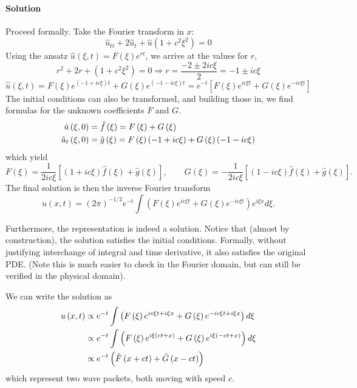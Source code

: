\documentclass[letterpaper,twoside,11pt]{article}
\theoremstyle{mystyle}
\begin{document}
\paragraph*{Solution} Proceed formally. Take the Fourier transform in $x$: 
\[{{\hat u}_{tt}} + 2{{\hat u}_t} + \hat u\left( {1 + {c^2}{\xi ^2}} \right) = 0\]
Using the ansatz $\hat u (\xi, t) = F(\xi)e^{rt}$, we arrive at the values for $r$, 
\[{r^2} + 2r + \left( {1 + {c^2}{\xi ^2}} \right) = 0 \Rightarrow r = \frac{{ - 2 \pm 2ic\xi }}{2} =  - 1 \pm ic\xi \]
\[\hat u\left( {\xi ,t} \right) = F\left( \xi  \right){e^{\left( { - 1 + ic\xi } \right)t}} + G\left( \xi  \right){e^{\left( { - 1 - ic\xi } \right)t}} = {e^{ - t}}\left[ {F\left( \xi  \right){e^{ic\xi t}} + G\left( \xi  \right){e^{ - ic\xi t}}} \right]\]
The initial conditions can also be transformed, and building those in, we find formulas for the unknown coefficients $F$ and $G$. 
\begin{align*}
  \hat u\left( {\xi ,0} \right) &= \hat f\left( \xi  \right) = F\left( \xi  \right) + G\left( \xi  \right) \hfill \\
  {{\hat u}_t}\left( {\xi ,0} \right) &= \hat g\left( \xi  \right) = F\left( \xi  \right)\left( { - 1 + ic\xi } \right) + G\left( \xi  \right)\left( { - 1 - ic\xi } \right) 
\end{align*}
which yield 
\[F\left( \xi  \right) = \frac{1}{{2ic\xi }}\left[ {\left( {1 + ic\xi } \right)\hat f\left( \xi  \right) + \hat g\left( \xi  \right)} \right],\qquad G\left( \xi  \right) =  - \frac{1}{{2ic\xi }}\left[ {\left( {1 - ic\xi } \right)\hat f\left( \xi  \right) + \hat g (\xi)} \right].\]
The final solution is then the inverse Fourier transform 
\[u\left( {x,t} \right) = {\left( {2\pi } \right)^{ - 1/2}}{e^{ - t}}\int {\left( {F\left( \xi  \right){e^{ic\xi t}} + G\left( \xi  \right){e^{ - ic\xi t}}} \right){e^{i\xi x}}d\xi } .\]

Furthermore, the representation is indeed a solution. Notice that (almost by construction), the solution satisfies the initial conditions. Formally, without justifying interchange of integral and time derivative, it also satisfies the original PDE. (Note this is much easier to check in the Fourier domain, but can still be verified in the physical domain). 

We can write the solution as 
\begin{align*}
  u\left( {x,t} \right) &\propto {e^{ - t}}\int {\left( {F\left( \xi  \right){e^{ic\xi t + i\xi x}} + G\left( \xi  \right){e^{ - ic\xi t + i\xi x}}} \right)d\xi }  \hfill \\
   &\propto {e^{ - t}}\int {\left( {F\left( \xi  \right){e^{i\xi \left( {ct + x} \right)}} + G\left( \xi  \right){e^{i\xi \left( { - ct + x} \right)}}} \right)d\xi }  \hfill \\
   &\propto {e^{ - t}}\left( {\check{F} \left( {x + ct} \right) +  \check G \left( {x - ct} \right)} \right) 
  \end{align*}
which represent two wave packets, both moving with speed $c$. 
\end{document}

